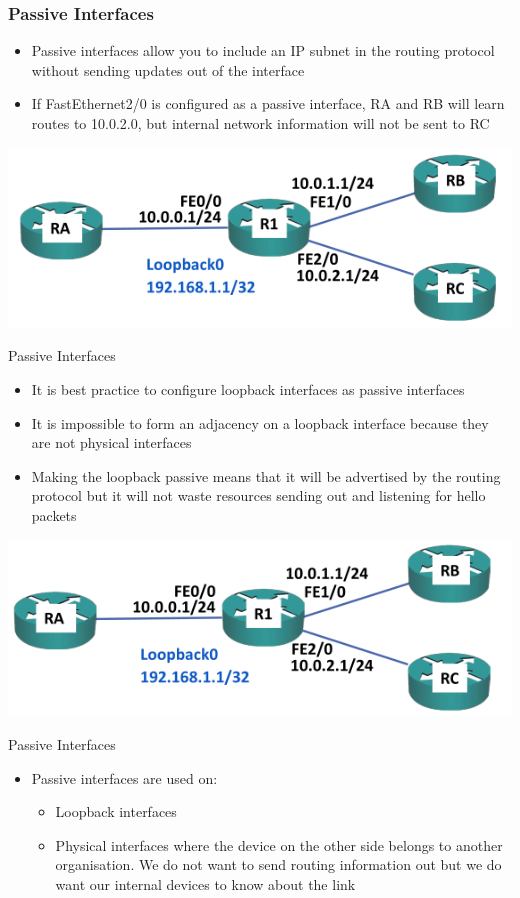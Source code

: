 \documentclass[pdflatex,compress,mathserif]{beamer}
\begin{document}
\begin{frame}
	\frametitle{Passive Interfaces}
	\begin{itemize}
		\item Passive interfaces allow you to include an IP subnet in the routing
protocol without sending updates out of the interface
		\item If FastEthernet2/0 is configured as a passive interface, RA and RB will
learn routes to 10.0.2.0, but internal network information will not be
sent to RC
	\end{itemize}
	\begin{center}
		\includegraphics[width=0.6\linewidth]{img/img39}
	\end{center}
\end{frame}

\begin{frame}{Passive Interfaces}
	\begin{itemize}
		\item It is best practice to configure loopback interfaces as passive interfaces
		\item It is impossible to form an adjacency on a loopback interface because
they are not physical interfaces
		\item Making the loopback passive means that it will be advertised by the
routing protocol but it will not waste resources sending out and listening
for hello packets
	\end{itemize}
	\begin{center}
		\includegraphics[width=0.6\linewidth]{img/img40}
	\end{center}
\end{frame}

\begin{frame}{Passive Interfaces}
	\begin{itemize}
		\item Passive interfaces are used on:
		\begin{itemize}
			\item Loopback interfaces
			\item Physical interfaces where the device on the other side belongs to
another organisation. We do not want to send routing information
out but we do want our internal devices to know about the link
		\end{itemize}
	\end{itemize}
\end{frame}
\end{document}
